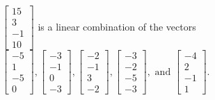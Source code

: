 \begin{exercise}
\begin{exerciseStatement}
  \end{exerciseStatement}
  \begin{exerciseAnswer}
   \(\left[\begin{array}{c}
15 \\
3 \\
-1 \\
10
\end{array}\right]\) 
  	 is  
	a linear combination of the vectors \(\left[\begin{array}{c}
-5 \\
1 \\
-5 \\
0
\end{array}\right] , \left[\begin{array}{c}
-3 \\
-1 \\
0 \\
-3
\end{array}\right] , \left[\begin{array}{c}
-2 \\
-1 \\
3 \\
-2
\end{array}\right] , \left[\begin{array}{c}
-3 \\
-2 \\
-5 \\
-3
\end{array}\right] , \text{ and } \left[\begin{array}{c}
-4 \\
2 \\
-1 \\
1
\end{array}\right]\).

	
  


  \end{exerciseAnswer}
\end{exercise}